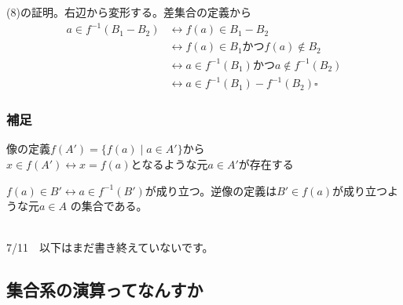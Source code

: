 \documentclass[a4j,dvipdfmx]{jsarticle}
\begin{document}
(8)の証明。右辺から変形する。差集合の定義から
\begin{align*}
    a \in f^{-1}(B_1-B_2)
    &\leftrightarrow f(a)\in B_1-B_2 \\
    &\leftrightarrow f(a)\in B_1かつf(a)\notin B_2\\
    &\leftrightarrow a\in f^{-1}(B_1)かつa\notin f^{-1}(B_2)\\
    &\leftrightarrow a\in f^{-1}(B_1)-f^{-1}(B_2)\square
\end{align*}
\color{black}
\newpage
\subsubsection*{補足}
像の定義$f(A')=\{f(a)\mid a\in A'\}$から$x\in f(A')\leftrightarrow x=f(a)となるような元a\in A'が存在する$

$f(a) \in B' \leftrightarrow a \in f^{-1}(B')$が成り立つ。逆像の定義は$B'\in f(a)$が成り立つような元$a\in A$
の集合である。

\hrulefill\\
7/11　以下はまだ書き終えていないです。
\newpage
\subsection{集合系の演算ってなんすか}
\end{document}
